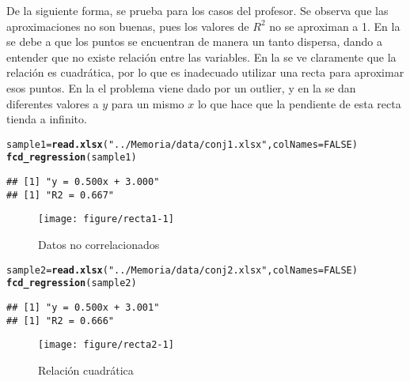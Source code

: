 \documentclass[12pt]{report}\usepackage[]{graphicx}\usepackage[dvipsnames]{xcolor}
\makeatletter
\def\maxwidth{ %
  \ifdim\Gin@nat@width>\linewidth
    \linewidth
  \else
    \Gin@nat@width
  \fi
}
\newcommand{\hlnum}[1]{\textcolor[rgb]{0.686,0.059,0.569}{#1}}%
\newcommand{\hlstr}[1]{\textcolor[rgb]{0.192,0.494,0.8}{#1}}%
\newcommand{\hlstd}[1]{\textcolor[rgb]{0.345,0.345,0.345}{#1}}%
\newcommand{\hlkwb}[1]{\textcolor[rgb]{0.69,0.353,0.396}{#1}}%
\newcommand{\hlkwc}[1]{\textcolor[rgb]{0.333,0.667,0.333}{#1}}%
\newcommand{\hlkwd}[1]{\textcolor[rgb]{0.737,0.353,0.396}{\textbf{#1}}}%
\newenvironment{kframe}{%
 \def\at@end@of@kframe{}%
 \ifinner\ifhmode%
  \def\at@end@of@kframe{\end{minipage}}%
  \begin{minipage}{\columnwidth}%
 \fi\fi%
 \def\FrameCommand##1{\hskip\@totalleftmargin \hskip-\fboxsep
 \colorbox{shadecolor}{##1}\hskip-\fboxsep
     \hskip-\linewidth \hskip-\@totalleftmargin \hskip\columnwidth}%
 \MakeFramed {\advance\hsize-\width
   \@totalleftmargin\z@ \linewidth\hsize
   \@setminipage}}%
 {\par\unskip\endMakeFramed%
 \at@end@of@kframe}
\newenvironment{knitrout}{}{} %
\makeatother
\begin{document}
 				De la siguiente forma, se prueba para los casos del profesor. Se observa que las aproximaciones no son buenas, pues los valores de $R^2$ no se aproximan a 1. En la  se debe a que los puntos se encuentran de manera un tanto dispersa, dando a entender que no existe relación entre las variables. En la  se ve claramente que la relación es cuadrática, por lo que es inadecuado utilizar una recta para aproximar esos puntos. En la  el problema viene dado por un outlier, y en la  se dan diferentes valores a $y$ para un mismo $x$ lo que hace que la pendiente de esta recta tienda a infinito. %
 				
\begin{knitrout}
\color{fgcolor}\begin{kframe}
\begin{alltt}
\hlstd{sample1} \hlkwb{=} \hlkwd{read.xlsx}\hlstd{(}\hlstr{"../Memoria/data/conj1.xlsx"}\hlstd{,} \hlkwc{colNames}\hlstd{=}\hlnum{FALSE}\hlstd{)}
\hlkwd{fcd_regression}\hlstd{(sample1)}
\end{alltt}
\begin{verbatim}
## [1] "y = 0.500x + 3.000"
## [1] "R2 = 0.667"
\end{verbatim}
\end{kframe}\begin{figure}

{\centering \texttt{[image: figure/recta1-1]} 

}

\caption[Datos no correlacionados]{Datos no correlacionados}\label{fig:recta1}
\end{figure}

\end{knitrout}
 				
\begin{knitrout}
\color{fgcolor}\begin{kframe}
\begin{alltt}
\hlstd{sample2} \hlkwb{=} \hlkwd{read.xlsx}\hlstd{(}\hlstr{"../Memoria/data/conj2.xlsx"}\hlstd{,} \hlkwc{colNames}\hlstd{=}\hlnum{FALSE}\hlstd{)}
\hlkwd{fcd_regression}\hlstd{(sample2)}
\end{alltt}
\begin{verbatim}
## [1] "y = 0.500x + 3.001"
## [1] "R2 = 0.666"
\end{verbatim}
\end{kframe}\begin{figure}

{\centering \texttt{[image: figure/recta2-1]} 

}

\caption[Relación cuadrática]{Relación cuadrática}\label{fig:recta2}
\end{figure}

\end{knitrout}
 				
\end{document}
